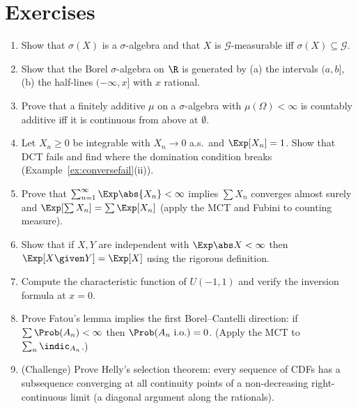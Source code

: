 \section*{Exercises}

\begin{enumerate}
\item Show that $\sigma(X)$ is a $\sigma$-algebra and that $X$ is $\mathcal G$-measurable iff
$\sigma(X)\subseteq\mathcal G$.
\item Show that the Borel $\sigma$-algebra on $\R$ is generated by (a) the intervals $(a,b]$,
(b) the half-lines $(-\infty,x]$ with $x$ rational.
\item Prove that a finitely additive $\mu$ on a $\sigma$-algebra with $\mu(\Omega)<\infty$ is
countably additive iff it is continuous from above at $\emptyset$.
\item Let $X_n\ge0$ be integrable with $X_n\to0$ a.s.\ and $\Exp[X_n]=1$. Show that DCT fails
and find where the domination condition breaks (Example~\ref{ex:conversefail}(ii)).
\item Prove that $\sum_{n=1}^\infty\Exp\abs{X_n}<\infty$ implies $\sum X_n$ converges almost
surely and $\Exp[\sum X_n]=\sum\Exp[X_n]$ (apply the MCT and Fubini to counting measure).
\item Show that if $X,Y$ are independent with $\Exp\abs X<\infty$ then
$\Exp[X\given Y]=\Exp[X]$ using the rigorous definition.
\item Compute the characteristic function of $U(-1,1)$ and verify the inversion
formula at $x=0$.
\item Prove Fatou's lemma implies the first Borel--Cantelli direction: if
$\sum\Prob(A_n)<\infty$ then $\Prob(A_n\text{ i.o.})=0$. (Apply the MCT to
$\sum_n\indic_{A_n}$.)
\item (Challenge) Prove Helly's selection theorem: every sequence of CDFs has a
subsequence converging at all continuity points of a non-decreasing right-continuous limit
(a diagonal argument along the rationals).
\end{enumerate}
